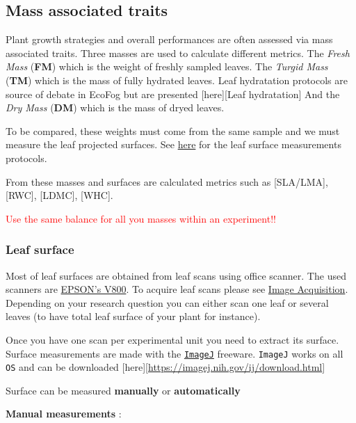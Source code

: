 \documentclass[
  12pt,
  american,
  a4paper,
  extrafontsizes,onecolumn,openright
  ]{memoir}
\newlength{\rf}
\begin{document}
\hypertarget{mass-associated-traits}{%
\subsection{Mass associated traits}\label{mass-associated-traits}}

Plant growth strategies and overall performances are often assessed via mass associated traits.
Three masses are used to calculate different metrics.
The \emph{Fresh Mass} (\textbf{FM}) which is the weight of freshly sampled leaves.
The \emph{Turgid Mass} (\textbf{TM}) which is the mass of fully hydrated leaves.
Leaf hydratation protocols are source of debate in EcoFog but are presented {[}here{]}{[}Leaf hydratation{]}
And the \emph{Dry Mass} (\textbf{DM}) which is the mass of dryed leaves.

To be compared, these weights must come from the same sample and we must measure the leaf projected surfaces.
See \protect\hyperlink{leaf-surface}{here} for the leaf surface measurements protocols.

From these masses and surfaces are calculated metrics such as {[}SLA/LMA{]}, {[}RWC{]}, {[}LDMC{]}, {[}WHC{]}.

\textcolor{red}{Use the same balance for all you masses within an experiment!!}

\hypertarget{leaf-surface}{%
\subsubsection{Leaf surface}\label{leaf-surface}}

Most of leaf surfaces are obtained from leaf scans using office scanner.
The used scanners are \href{document/machine/EPSON_V800/usersguide.pdf}{EPSON's V800}.
To acquire leaf scans please see \protect\hyperlink{image-acquisition}{Image Acquisition}.
Depending on your research question you can either scan one leaf or several leaves (to have total leaf surface of your plant for instance).

Once you have one scan per experimental unit you need to extract its surface.
Surface measurements are made with the \href{document/software/ImageJ/user-guide-A4booklet.pdf}{\texttt{ImageJ}} freeware.
\texttt{ImageJ} works on all \texttt{OS} and can be downloaded {[}here{]}{[}\url{https://imagej.nih.gov/ij/download.html}{]}

Surface can be measured \textbf{manually} or \textbf{automatically}

\textbf{Manual measurements} :
\end{document}

